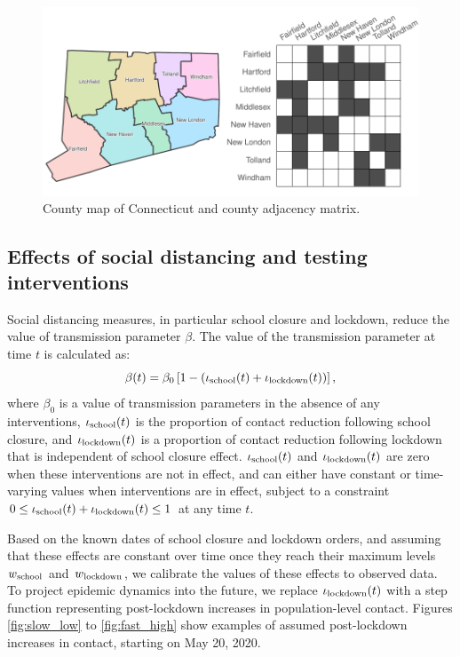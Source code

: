 \documentclass[11pt]{article}
\begin{document}
\begin{figure} %
	\centering
	\includegraphics[width=.7\textwidth]{figures/map_adj.pdf}
	\caption{County map of Connecticut and county adjacency matrix.}
	\label{fig:map}
\end{figure}




\subsection{Effects of social distancing and testing interventions} 

Social distancing measures, in particular school closure and lockdown, reduce the value of transmission parameter $\beta$. The value of the transmission parameter at time $t$ is calculated as:
\[ \beta(t) = \beta_0 \left[ 1 - ( \iota\textsubscript{school}(t) + \iota\textsubscript{lockdown} (t)) \right] , \]
where $\beta_0$ is a value of transmission parameters in the absence of any interventions, $\iota\textsubscript{school}(t)$ is the proportion of contact reduction following school closure, and $\iota\textsubscript{lockdown} (t)$ is a proportion of contact reduction following lockdown that is independent of school closure effect. $\iota\textsubscript{school}(t)$ and $\iota\textsubscript{lockdown} (t)$ are zero when these interventions are not in effect, and can either have constant or time-varying values when interventions are in effect, subject to a constraint $ 0 \le \iota\textsubscript{school}(t) + \iota\textsubscript{lockdown} (t) \le 1 $ at any time $t$.

Based on the known dates of school closure and lockdown orders, and assuming that these effects are constant over time once they reach their maximum levels $w\textsubscript{school}$ and $w\textsubscript{lockdown}$, we calibrate the values of these effects to observed data. To project epidemic dynamics into the future, we replace  $\iota\textsubscript{lockdown} (t)$ with a step function representing post-lockdown increases in population-level contact.  Figures \ref{fig:slow_low} to \ref{fig:fast_high} show examples of assumed post-lockdown increases in contact, starting on May 20, 2020. 
\end{document}
